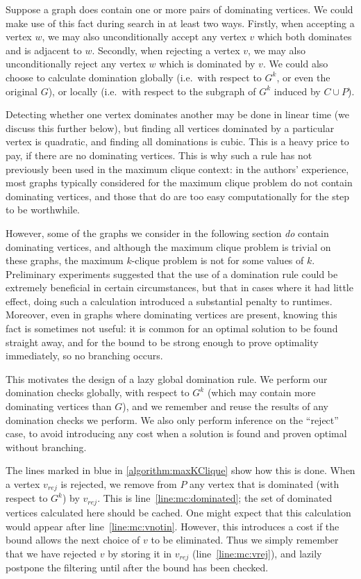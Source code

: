 \documentclass[letterpaper]{article}
\newcommand{\mcline}[1]{line~\ref{line:mc:#1}}
\newcommand{\vrej}{v_{\mathit{rej}}}
\begin{document}
Suppose a graph does contain one or more pairs of dominating vertices. We could make use of this
fact during search in at least two ways. Firstly, when accepting a vertex $w$, we may also
unconditionally accept any vertex $v$ which both dominates and is adjacent to $w$. Secondly, when
rejecting a vertex $v$, we may also unconditionally reject any vertex $w$ which is dominated by $v$.
We could also choose to calculate domination globally (i.e.\ with respect to $G^k$, or even the
original $G$), or locally (i.e.\ with respect to the subgraph of $G^k$ induced by $C \cup P$).

Detecting whether one vertex dominates another may be done in linear time (we discuss this further
below), but finding all vertices dominated by a particular vertex is quadratic, and finding all
dominations is cubic. This is a heavy price to pay, if there are no dominating vertices.  This is
why such a rule has not previously been used in the maximum clique context: in the authors'
experience, most graphs typically considered for the maximum clique problem do not contain
dominating vertices, and those that do are too easy computationally for the step to be worthwhile.

However, some of the graphs we consider in the following section \emph{do} contain dominating
vertices, and although the maximum clique problem is trivial on these graphs, the maximum $k$-clique
problem is not for some values of $k$. Preliminary experiments suggested that the use of a
domination rule could be extremely beneficial in certain circumstances, but that in cases where it
had little effect, doing such a calculation introduced a substantial penalty to runtimes. Moreover,
even in graphs where dominating vertices are present, knowing this fact is sometimes not useful: it
is common for an optimal solution to be found straight away, and for the bound to be strong enough
to prove optimality immediately, so no branching occurs.

This motivates the design of a lazy global domination rule. We perform our domination checks
globally, with respect to $G^k$ (which may contain more dominating vertices than $G$), and we
remember and reuse the results of any domination checks we perform. We also only perform inference
on the ``reject'' case, to avoid introducing any cost when a solution is found and proven optimal
without branching.

The lines marked in blue in \cref{algorithm:maxKClique} show how this is done. When a vertex $\vrej$
is rejected, we remove from $P$ any vertex that is dominated (with respect to $G^k$) by $\vrej$.
This is \mcline{dominated}; the set of dominated vertices calculated here should be cached.  One
might expect that this calculation would appear after \mcline{vnotin}. However, this introduces a
cost if the bound allows the next choice of $v$ to be eliminated. Thus we simply remember that we
have rejected $v$ by storing it in $\vrej$ (\mcline{vrej}), and lazily postpone the filtering until
after the bound has been checked.
\end{document}
